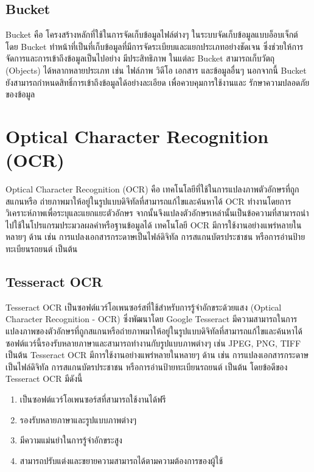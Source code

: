  \subsection{Bucket}
    \qquad Bucket คือ โครงสร้างหลักที่ใช้ในการจัดเก็บข้อมูลไฟล์ต่างๆ ในระบบจัดเก็บข้อมูลแบบอ็อบเจ็กต์ โดย Bucket
    ทำหน้าที่เป็นที่เก็บข้อมูลที่มีการจัดระเบียบและแยกประเภทอย่างชัดเจน ซึ่งช่วยให้การจัดการและการเข้าถึงข้อมูลเป็นไปอย่าง
    มีประสิทธิภาพ ในแต่ละ Bucket สามารถเก็บวัตถุ (Objects) ได้หลากหลายประเภท เช่น ไฟล์ภาพ วิดีโอ เอกสาร
    และข้อมูลอื่นๆ นอกจากนี้ Bucket ยังสามารถกำหนดสิทธิ์การเข้าถึงข้อมูลได้อย่างละเอียด เพื่อควบคุมการใช้งานและ
    รักษาความปลอดภัยของข้อมูล \cite{Bucket}

\section{Optical Character Recognition (OCR)}
  \qquad Optical Character Recognition (OCR) คือ เทคโนโลยีที่ใช้ในการแปลงภาพตัวอักษรที่ถูกสแกนหรือ
  ถ่ายภาพมาให้อยู่ในรูปแบบดิจิทัลที่สามารถแก้ไขและค้นหาได้ OCR ทำงานโดยการวิเคราะห์ภาพเพื่อระบุและแยกแยะตัวอักษร
  จากนั้นจึงแปลงตัวอักษรเหล่านั้นเป็นข้อความที่สามารถนำไปใช้ในโปรแกรมประมวลผลคำหรือฐานข้อมูลได้ 
  เทคโนโลยี OCR มีการใช้งานอย่างแพร่หลายในหลายๆ ด้าน เช่น การแปลงเอกสารกระดาษเป็นไฟล์ดิจิทัล 
  การสแกนบัตรประชาชน หรือการอ่านป้ายทะเบียนรถยนต์ เป็นต้น \cite{OCR}
  \subsection{Tesseract OCR}
    \qquad Tesseract OCR เป็นซอฟต์แวร์โอเพนซอร์สที่ใช้สำหรับการรู้จำอักขระด้วยแสง 
    (Optical Character Recognition - OCR) ซึ่งพัฒนาโดย Google Tesseract
    มีความสามารถในการแปลงภาพของตัวอักษรที่ถูกสแกนหรือถ่ายภาพมาให้อยู่ในรูปแบบดิจิทัลที่สามารถแก้ไขและค้นหาได้
    ซอฟต์แวร์นี้รองรับหลายภาษาและสามารถทำงานกับรูปแบบภาพต่างๆ เช่น JPEG, PNG, TIFF เป็นต้น Tesseract OCR
    มีการใช้งานอย่างแพร่หลายในหลายๆ ด้าน เช่น การแปลงเอกสารกระดาษเป็นไฟล์ดิจิทัล การสแกนบัตรประชาชน
    หรือการอ่านป้ายทะเบียนรถยนต์ เป็นต้น โดยข้อดีของ Tesseract OCR มีดังนี้ \cite{Tesseract}
    \begin{enumerate}
      \item เป็นซอฟต์แวร์โอเพนซอร์สที่สามารถใช้งานได้ฟรี
      \item รองรับหลายภาษาและรูปแบบภาพต่างๆ
      \item มีความแม่นยำในการรู้จำอักขระสูง
      \item สามารถปรับแต่งและขยายความสามารถได้ตามความต้องการของผู้ใช้
    \end{enumerate}

